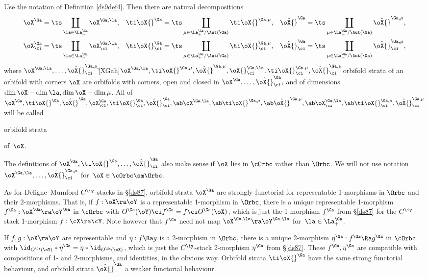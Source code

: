 \documentclass{article}
\begin{document}
\begin{thm}
Use the notation of Definition\/ {\rm\ref{ds9def4}}. Then there are
natural decompositions
\begin{align*}
\oX^\Ga&=\ts\coprod_{\la\in\La^\Ga_+}\oX^{\Ga,\la},&\ti\oX{}^\Ga
&=\ts\coprod_{\mu\in\La^\Ga_+/\Aut(\Ga)}\ti\oX{}^{\Ga,\mu},&
\hat\oX{}^\Ga &=\ts\coprod_{\mu\in\La^\Ga_+/\Aut(\Ga)}\hat\oX{}^{\Ga,\mu},\\
\oX^\Ga_\ci&=\ts\coprod_{\la\in\La^\Ga_+}\oX^{\Ga,\la}_\ci,&
\ti\oX{}^\Ga_\ci &=\ts\coprod_{\mu\in\La^\Ga_+/\Aut(\Ga)}
\ti\oX{}^{\Ga,\mu}_\ci,& \hat\oX{}^\Ga_\ci
&=\ts\coprod_{\mu\in\La^\Ga_+/\Aut(\Ga)}\hat\oX{}^{\Ga,\mu}_\ci,
\end{align*}
where\/
$\oX^{\Ga,\la},\ldots,\hat\oX{}^{\Ga,\mu}_\ci$\G[XGah]{$\oX^{\Ga,\la},
\ti\oX{}^{\Ga,\mu},\hat\oX{}^{\Ga,\mu},
\oX{}^{\Ga,\la}_\ci,\ti\oX{}^{\Ga,\mu}_\ci,\hat\oX{}^{\Ga,\mu}_\ci$}{orbifold
strata of an orbifold with corners $\oX$} are orbifolds with
corners, open and closed in $\oX^\Ga,\ldots,\hat\oX{}^\Ga_\ci,$ and
of dimensions $\dim\oX-\dim\la,\dim\oX-\dim\mu$. All of\/
$\oX^\Ga,\ti\oX{}^\Ga,\hat\oX{}^\Ga,\oX^\Ga_\ci,\ti\oX{}^\Ga_\ci,
\hat\oX{}^\Ga_\ci,\ab\oX^{\Ga,\la},\ab\ti\oX{}^{\Ga,\mu},\ab
\hat\oX{}^{\Ga,\mu},\ab\oX_\ci^{\Ga,\la},\ab\ti\oX{}^{\Ga,\mu}_\ci,
\hat\oX{}^{\Ga,\mu}_\ci$ will be called \begin{bfseries}orbifold
strata\end{bfseries} of\/~$\oX$.
\label{ds12thm4}
\end{thm}

The definitions of $\oX^\Ga,\ti\oX{}^\Ga,\ldots, \hat\oX{}^\Ga_\ci$
also make sense if $\oX$ lies in $\cOrbc$ rather than $\Orbc$. We
will not use notation $\oX^{\Ga,\la},\ldots,\hat\oX{}^{\Ga,\mu}_\ci$
for~$\oX\in\cOrbc\sm\Orbc$.

As for Deligne--Mumford $C^\iy$-stacks in \S\ref{ds87}, orbifold
strata $\oX^\Ga$ are strongly functorial for representable
1-morphisms in $\Orbc$ and their 2-morphisms. That is, if
$f:\oX\ra\oY$ is a representable 1-morphism in $\Orbc$, there is a
unique representable 1-morphism $f^\Ga:\oX^\Ga\ra\oY^\Ga$ in
$\cOrbc$ with $O^\Ga(\oY)\ci f^\Ga=f\ci O^\Ga(\oX)$, which is just
the 1-morphism $f^\Ga$ from \S\ref{ds87} for the $C^\iy$-stack
1-morphism $f:\cX\ra\cY$. Note however that $f^\Ga$ need not map
$\oX^{\Ga,\la}\ra\oY^{\Ga,\la}$ for~$\la\in\La^\Ga_+$.

If $f,g:\oX\ra\oY$ are representable and $\eta:f\Ra g$ is a
2-morphism in $\Orbc$, there is a unique 2-morphism
$\eta^\Ga:f^\Ga\Ra g^\Ga$ in $\cOrbc$ with
$\id_{O^\Ga(\oY)}*\eta^\Ga=\eta*\id_{O^\Ga(\oX)}$, which is just the
$C^\iy$-stack 2-morphism $\eta^\Ga$ from \S\ref{ds87}. These
$f^\Ga,\eta^\Ga$ are compatible with compositions of 1- and
2-morphisms, and identities, in the obvious way. Orbifold strata
$\ti\oX{}^\Ga$ have the same strong functorial behaviour, and
orbifold strata $\hat\oX{}^\Ga$ a weaker functorial behaviour.
\end{document}
